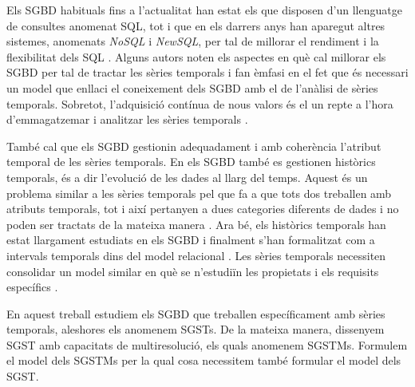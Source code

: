 Els \gls{SGBD} habituals fins a l'actualitat han estat els que
disposen d'un llenguatge de consultes anomenat \gls{SQL}, tot i que en
els darrers anys han aparegut altres sistemes, anomenats \emph{NoSQL}
i \emph{NewSQL}, per tal de millorar el rendiment i la flexibilitat
dels
\gls{SQL} \parencite{atzeni13:relational_model_dead,stonebraker10,stonebraker09:scidb,zhang11}. Alguns
autors \parencite{dreyer94,schmidt95,stonebraker09:scidb,zhang11}
noten els aspectes en què cal millorar els \gls{SGBD} per tal de
tractar les sèries temporals i fan èmfasi en el fet que és necessari
un model que enllaci el coneixement dels \gls{SGBD} amb el de
l'anàlisi de sèries temporals. Sobretot, l'adquisició contínua de nous
valors és el un repte a l'hora d'emmagatzemar i analitzar les sèries
temporals \parencite{keogh97}. 



També cal que els \gls{SGBD} gestionin adequadament i amb coherència
l'atribut temporal de les sèries temporals.  En els \gls{SGBD} també
es gestionen històrics temporals, és a dir l'evolució de les dades al
llarg del temps. Aquest és un problema similar a les sèries temporals
pel que fa a que tots dos treballen amb atributs temporals, tot i així
pertanyen a dues categories diferents de dades i no poden ser tractats
de la mateixa manera \parencite{assfalg08:thesis,schmidt95}.  Ara bé,
els històrics temporals han estat llargament estudiats en els
\gls{SGBD} i finalment s'han formalitzat com a intervals temporals
dins del model relacional \parencite{date02:_tempor_data_relat_model}.
Les sèries temporals necessiten consolidar un model similar en què se
n'estudiïn les propietats i els requisits
específics \parencite{dreyer94,segev87:sigmod}.




En aquest treball estudiem els \gls{SGBD} que treballen
específicament amb sèries temporals, aleshores els anomenem
\glspl{SGST}. De la mateixa manera, dissenyem \gls{SGST} amb
capacitats de multiresolució, els quals anomenem
\glspl{SGSTM}. Formulem el model dels \glspl{SGSTM} per la qual cosa
necessitem també formular el model dels \gls{SGST}.




